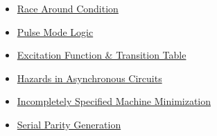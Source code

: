 \documentclass[12pt,a4paper]{article}
\begin{document}
\begin{tcolorbox}[breakable,colback=cE!5,colframe=cE,boxrule=1pt,arc=5pt,
  left=8pt,right=8pt,top=8pt,bottom=8pt,before skip=4pt]
\begin{itemize}[leftmargin=1.2em,itemsep=1pt,label={\textcolor{cE}{$\triangleright$}}]
\begin{itemize}[leftmargin=1.5em,itemsep=0pt,label={\textcolor{cE}{$\cdot$}}]
        \item \hyperref[sub:s6-race]{Race Around Condition}
        \item \hyperref[sub:s6-pulse]{Pulse Mode Logic}
        \item \hyperref[sub:s6-excitation]{Excitation Function \& Transition Table}
        \item \hyperref[sub:s6-hazards]{Hazards in Asynchronous Circuits}
        \item \hyperref[sub:s6-incomp]{Incompletely Specified Machine Minimization}
        \item \hyperref[sub:s6-parity]{Serial Parity Generation}
      \end{itemize}
  \end{itemize}
\end{tcolorbox}
\end{document}
